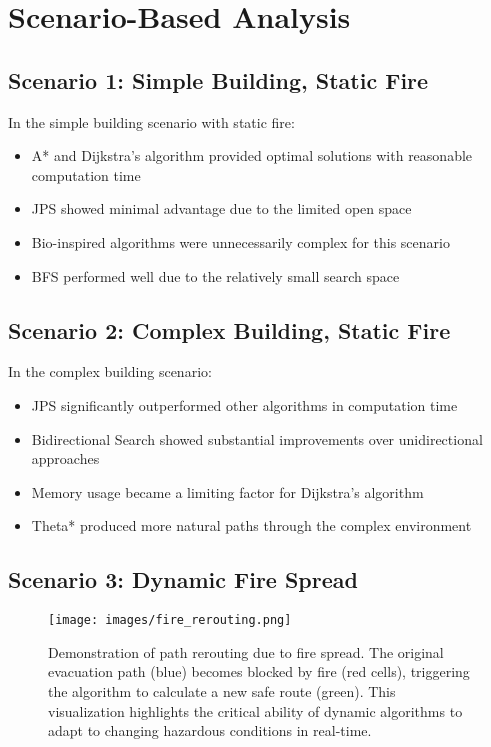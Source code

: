 \documentclass[11pt,a4paper]{report}
\begin{document}
\section{Scenario-Based Analysis}

\subsection{Scenario 1: Simple Building, Static Fire}
In the simple building scenario with static fire:
\begin{itemize}
    \item A* and Dijkstra's algorithm provided optimal solutions with reasonable computation time
    \item JPS showed minimal advantage due to the limited open space
    \item Bio-inspired algorithms were unnecessarily complex for this scenario
    \item BFS performed well due to the relatively small search space
\end{itemize}

\subsection{Scenario 2: Complex Building, Static Fire}
In the complex building scenario:
\begin{itemize}
    \item JPS significantly outperformed other algorithms in computation time
    \item Bidirectional Search showed substantial improvements over unidirectional approaches
    \item Memory usage became a limiting factor for Dijkstra's algorithm
    \item Theta* produced more natural paths through the complex environment
\end{itemize}

\subsection{Scenario 3: Dynamic Fire Spread}
\begin{figure}[H]
    \centering
    \texttt{[image: images/fire\_rerouting.png]}
    \caption{Demonstration of path rerouting due to fire spread. The original evacuation path (blue) becomes blocked by fire (red cells), triggering the algorithm to calculate a new safe route (green). This visualization highlights the critical ability of dynamic algorithms to adapt to changing hazardous conditions in real-time.}
    \label{fig:fire_rerouting}
\end{figure}
\end{document}
